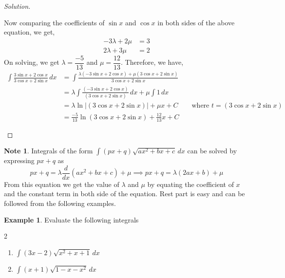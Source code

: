 \documentclass{book}
\theoremstyle{definition}
\newtheorem{example}{Example}[section]
\newtheorem*{note}{Note}
\newenvironment{solution}
    {\begin{proof}[Solution]}
    {\end{proof}}
\begin{document}
\begin{solution}
\begin{enumerate}[label=(\roman*)]
Now comparing the coefficients of $\sin x$ and $\cos x$ in both sides of the above equation, we get, 
\begin{align*}
    -3\lambda+2\mu&=3 \\ 
    2\lambda+3\mu&=2
\end{align*}
On solving, we get $\lambda=\dfrac{-5}{13}$ and $\mu=\dfrac{12}{13}$. Therefore, we have,
\begin{align*}
    \int\frac{3\sin x+2\cos x}{3\cos x+2\sin x}\,dx &= \int\frac{\lambda(-3\sin x+2\cos x)+\mu (3\cos x+2\sin x)}{3\cos x+2\sin x} \\ 
    &= \lambda\int\frac{(-3\sin x+2\cos x)}{(3\cos x+2\sin x)}\,dx+\mu\int1\,dx \\
    &= \lambda \ln|(3\cos x+2\sin x)|+\mu x+C \qquad \text{where $t=(3\cos x+2\sin x)$} \\
    &= \frac{-5}{13}\ln(3\cos x+2\sin x)+\frac{12}{13}x+C
\end{align*}

\end{enumerate} 
\end{solution} 

\begin{note}
Integrals of the form $\int (px+q)\sqrt{ax^2+bx+c}\,dx$ can be solved by expressing $px+q$ as
\[
px+q=\lambda \frac{d}{dx}(ax^2+bx+c)+\mu \implies px+q=\lambda (2ax+b)+\mu
\]
From this equation we get the value of $\lambda$ and $\mu$ by equating the coefficient of $x$ and the constant term in both side of the equation. Rest part is easy and can be followed from the following examples.

\end{note}

\begin{example}
Evaluate the following integrals
\begin{multicols}{2}
\begin{enumerate}[label=(\roman*)]
    \item $\int (3x-2)\sqrt{x^2+x+1}\,dx$
    \item $\int (x+1)\sqrt{1-x-x^2}\,dx$ 
\end{enumerate}
\end{multicols}    
\end{example}
\end{document}
